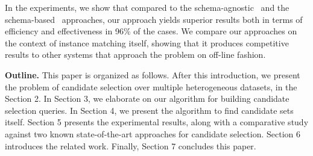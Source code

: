 In the experiments, we show that compared to the schema-agnostic~\cite{papadakis_efficient_2011} and the schema-based~\cite{DBLP:conf/semweb/SongH11} approaches, our approach yields superior results both in terms of efficiency and effectiveness in 96\% of the cases. We compare our approaches on the context of instance matching itself, showing that it produces competitive results to other systems that approach the problem on off-line fashion.

\textbf{Outline.} 
This paper is organized as follows. After this introduction, we present the problem of candidate selection over multiple heterogeneous datasets, in the Section 2. In Section 3, we elaborate on our algorithm for building candidate selection queries. In Section 4, we present the algorithm to find candidate sets itself.  Section 5 presents the experimental results, along with a comparative study against two known state-of-the-art approaches for candidate selection. Section 6 introduces the related work. Finally, Section 7 concludes this paper.

